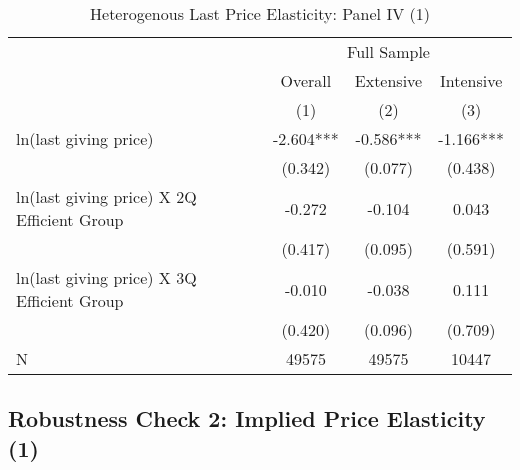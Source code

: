 \documentclass[ review  , 3p ]{elsarticle}
\begin{document}
  \begin{table}
  
  \caption{\label{tab:kableHeteroLastElasticitySlide1}Heterogenous Last Price Elasticity: Panel IV (1)}
  \centering
  \fontsize{8}{10}\selectfont
  \begin{tabular}[t]{lccc}
  \toprule
  \multicolumn{1}{c}{ } & \multicolumn{3}{c}{Full Sample} \\
  \cmidrule(l{3pt}r{3pt}){2-4}
  \multicolumn{1}{c}{ } & \multicolumn{1}{c}{Overall} & \multicolumn{1}{c}{Extensive} & \multicolumn{1}{c}{Intensive} \\
  \cmidrule(l{3pt}r{3pt}){2-2} \cmidrule(l{3pt}r{3pt}){3-3} \cmidrule(l{3pt}r{3pt}){4-4}
   & (1) & (2) & (3)\\
  \midrule
  ln(last giving price) & -2.604*** & -0.586*** & -1.166***\\
   & (0.342) & (0.077) & (0.438)\\
  ln(last giving price) X 2Q Efficient Group & -0.272 & -0.104 & 0.043\\
   & (0.417) & (0.095) & (0.591)\\
  ln(last giving price) X 3Q Efficient Group & -0.010 & -0.038 & 0.111\\
   & (0.420) & (0.096) & (0.709)\\
  N & 49575 & 49575 & 10447\\
  \bottomrule
  \end{tabular}
  \end{table}
  
  \hypertarget{robustness-check-2-implied-price-elasticity-1}{%
  \subsection{Robustness Check 2: Implied Price Elasticity (1)}\label{robustness-check-2-implied-price-elasticity-1}}
  
\end{document}
